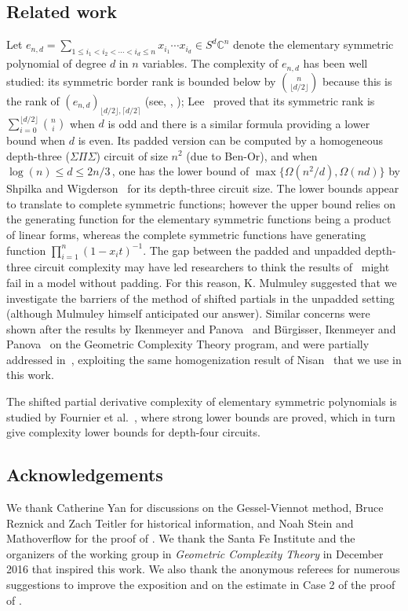 \documentclass{toc}
\def\BC{\mathbb C}
\begin{document}
 
 \subsection*{Related work} Let $e_{n,d}=\sum_{1\leq i_1<i_2< \cdots <i_d\leq n} x_{i_1}\cdots x_{i_d}\in S^d\BC^n$ denote the elementary symmetric polynomial of degree $d$ in $n$ variables. The complexity of $e_{n,d}$ has been well studied: its symmetric border rank is bounded below by $\binom{n}{\lfloor {d}/{2}\rfloor}$ because this is the rank of $(e_{n,d})_{ \lfloor d/2 \rfloor, \lceil d/2 \rceil}$ (see, \eg, \cite{NisWig:LowerBoundsArithCircPartDer}); 
 Lee~\cite{MR3440150} proved that its symmetric rank is $\sum_{i=0}^{\lfloor d/2\rfloor}\binom{n}{i}$ when $d$ is odd and there is a similar formula providing a lower bound when $d$ is even. Its padded version can be computed  by a homogeneous depth-three ($\Sigma\Pi\Sigma$)  circuit of size $n^2$ (due to Ben-Or), and when $\log(n)\leq d\leq {2n}/3$\,,  one has the lower bound of $\max\{ \Omega ({n^2}/{d}),\Omega(n d)\}$ %
 by Shpilka and Wigderson~\cite{MR1867306} for its depth-three circuit size. The lower bounds  appear to translate to complete symmetric functions; however the upper bound relies on the generating function for the elementary symmetric functions being a product of linear forms, whereas the complete symmetric functions have generating function $\prod_{i=1}^n (1-x_it)^{-1}$. The gap between the padded and unpadded depth-three circuit complexity may have led researchers to
 think the results of~\cite{2016arXiv160902103E} might fail in a model without padding. For this reason, K. Mulmuley suggested that we investigate the barriers of the method of shifted partials in the unpadded setting (although Mulmuley himself anticipated our answer). Similar concerns were shown after the results %
 by Ikenmeyer and Panova~\cite{IkPa:Rectangular_Kron_in_GCT} and B\"urgisser, Ikenmeyer and Panova~\cite{BuIkPa:no_occurrence_obstructions_in_GCT} on the Geometric Complexity Theory program, and were partially addressed in~\cite{GesIkPa:GCT_and_matrix_pow}, exploiting the same homogenization result of %
 Nisan~\cite{Nisan:1991:LBN:103418.103462} that we use in this work.
 
 The shifted partial derivative complexity of elementary symmetric polynomials is studied by  %
 Fournier et al.~\cite{MR3419496}, where strong lower bounds are proved, which in turn give complexity lower bounds for depth-four circuits.
 
 \subsection*{Acknowledgements} We thank Catherine Yan
%
%
 for discussions on the Gessel-Viennot method, Bruce Reznick and Zach Teitler for historical information, and Noah Stein and Mathoverflow for the proof of . We thank the Santa Fe Institute and the organizers of the working group in \emph{Geometric Complexity Theory} in December 2016 that inspired this work. We also thank the anonymous referees for numerous suggestions to improve the exposition and on the estimate in Case 2 of the proof of .
\end{document}
